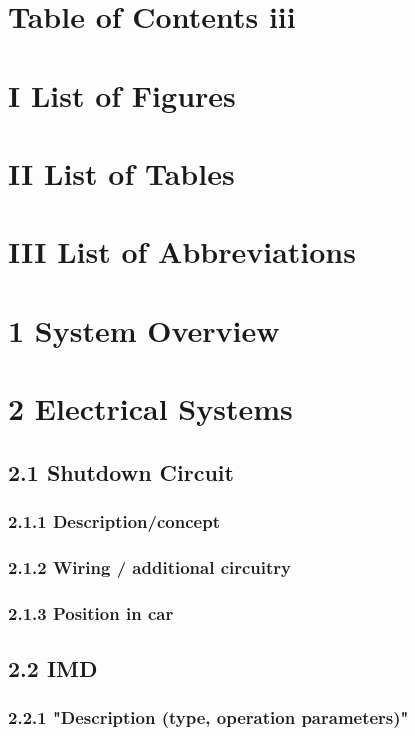 \documentclass{article}
\begin{document}
\section*{Table of Contents iii}

\section*{I List of Figures}

\section*{II List of Tables}

\section*{III List of Abbreviations}

\section*{1 System Overview}

\section*{2 Electrical Systems}

\subsection*{2.1 Shutdown Circuit}

\subsubsection*{2.1.1 Description/concept}

\subsubsection*{2.1.2 Wiring / additional circuitry}

\subsubsection*{2.1.3 Position in car}

\subsection*{2.2 IMD}

\subsubsection*{2.2.1 "Description (type, operation parameters)"}
\end{document}
